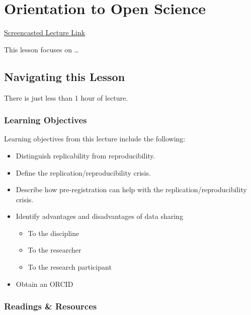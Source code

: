 \documentclass[
  english,
]{book}
\providecommand{\tightlist}{%
  \setlength{\itemsep}{0pt}\setlength{\parskip}{0pt}}
\begin{document}
\hypertarget{OpenScience}{%
\chapter{Orientation to Open Science}\label{OpenScience}}

\href{https://spu.hosted.panopto.com/Panopto/Pages/Viewer.aspx?pid=a46a76d9-1d4f-404c-96e9-ac770016d7db}{Screencasted Lecture Link}

This lesson focuses on \ldots{}

\hypertarget{navigating-this-lesson-7}{%
\section{Navigating this Lesson}\label{navigating-this-lesson-7}}

There is just less than 1 hour of lecture.

\hypertarget{learning-objectives-7}{%
\subsection{Learning Objectives}\label{learning-objectives-7}}

Learning objectives from this lecture include the following:

\begin{itemize}
\tightlist
\item
  Distinguish replicability from reproducibility.
\item
  Define the replication/reproducibility crisis.
\item
  Describe how pre-registration can help with the replication/reproducibility crisis.
\item
  Identify advantages and disadvantages of data sharing

  \begin{itemize}
  \tightlist
  \item
    To the discipline
  \item
    To the researcher
  \item
    To the research participant
  \end{itemize}
\item
  Obtain an ORCID
\end{itemize}

\hypertarget{readings-resources-7}{%
\subsection{Readings \& Resources}\label{readings-resources-7}}
\end{document}
